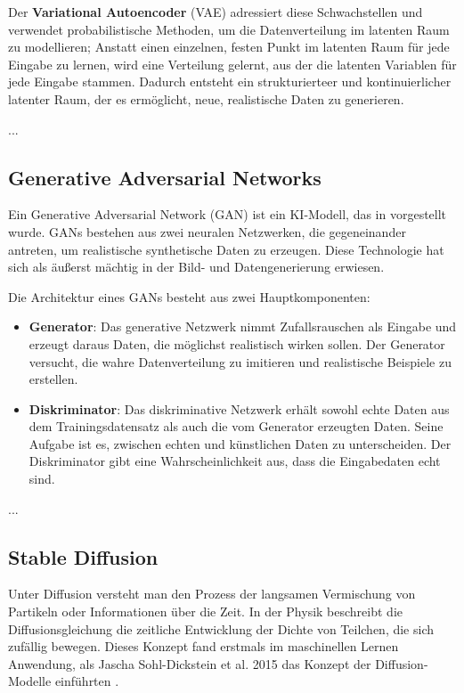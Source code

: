 Der \textbf{Variational Autoencoder} (VAE) adressiert diese Schwachstellen und verwendet probabilistische Methoden, um die Datenverteilung im latenten Raum zu modellieren; Anstatt einen einzelnen, festen Punkt im latenten Raum für jede Eingabe zu lernen, wird eine Verteilung gelernt, aus der die latenten Variablen für jede Eingabe stammen. Dadurch entsteht ein strukturierteer und kontinuierlicher latenter Raum, der es ermöglicht, neue, realistische Daten zu generieren. %

...

\subsection{Generative Adversarial Networks}

Ein Generative Adversarial Network (GAN) ist ein KI-Modell, das in \cite{} vorgestellt wurde. GANs bestehen aus zwei neuralen Netzwerken, die gegeneinander antreten, um realistische synthetische Daten zu erzeugen. Diese Technologie hat sich als äußerst mächtig in der Bild- und Datengenerierung erwiesen.

Die Architektur eines GANs besteht aus zwei Hauptkomponenten:

\begin{itemize}
	\item \textbf{Generator}: Das generative Netzwerk nimmt Zufallsrauschen als Eingabe und erzeugt daraus Daten, die möglichst realistisch wirken sollen. Der Generator versucht, die wahre Datenverteilung zu imitieren und realistische Beispiele zu erstellen.
	\item \textbf{Diskriminator}: Das diskriminative Netzwerk erhält sowohl echte Daten aus dem Trainingsdatensatz als auch die vom Generator erzeugten Daten. Seine Aufgabe ist es, zwischen echten und künstlichen Daten zu unterscheiden. Der Diskriminator gibt eine Wahrscheinlichkeit aus, dass die Eingabedaten echt sind.
\end{itemize}

...

\subsection{Stable Diffusion}

Unter Diffusion versteht man den Prozess der langsamen Vermischung von Partikeln oder Informationen über die Zeit. In der Physik beschreibt die Diffusionsgleichung die zeitliche Entwicklung der Dichte von Teilchen, die sich zufällig bewegen. Dieses Konzept fand erstmals im maschinellen Lernen Anwendung, als Jascha Sohl-Dickstein et al. 2015 das Konzept der Diffusion-Modelle einführten \parencite{}.

